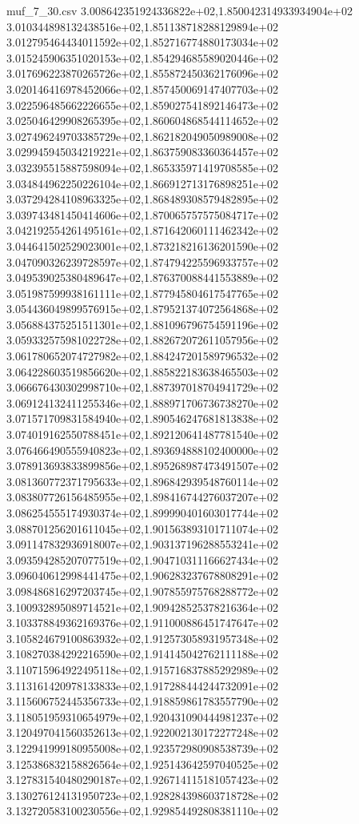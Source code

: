\begin{filecontents*}{muf_7_30.csv}
3.008642351924336822e+02,1.850042314933934904e+02
3.010344898132438516e+02,1.851138718288129894e+02
3.012795464434011592e+02,1.852716774880173034e+02
3.015245906351020153e+02,1.854294685589020446e+02
3.017696223870265726e+02,1.855872450362176096e+02
3.020146416978452066e+02,1.857450069147407703e+02
3.022596485662226655e+02,1.859027541892146473e+02
3.025046429908265395e+02,1.860604868544114652e+02
3.027496249703385729e+02,1.862182049050989008e+02
3.029945945034219221e+02,1.863759083360364457e+02
3.032395515887598094e+02,1.865335971419708585e+02
3.034844962250226104e+02,1.866912713176898251e+02
3.037294284108963325e+02,1.868489308579482895e+02
3.039743481450414606e+02,1.870065757575084717e+02
3.042192554261495161e+02,1.871642060111462342e+02
3.044641502529023001e+02,1.873218216136201590e+02
3.047090326239728597e+02,1.874794225596933757e+02
3.049539025380489647e+02,1.876370088441553889e+02
3.051987599938161111e+02,1.877945804617547765e+02
3.054436049899576915e+02,1.879521374072564868e+02
3.056884375251511301e+02,1.881096796754591196e+02
3.059332575981022728e+02,1.882672072611057956e+02
3.061780652074727982e+02,1.884247201589796532e+02
3.064228603519856620e+02,1.885822183638465503e+02
3.066676430302998710e+02,1.887397018704941729e+02
3.069124132411255346e+02,1.888971706736738270e+02
3.071571709831584940e+02,1.890546247681813838e+02
3.074019162550788451e+02,1.892120641487781540e+02
3.076466490555940823e+02,1.893694888102400000e+02
3.078913693833899856e+02,1.895268987473491507e+02
3.081360772371795633e+02,1.896842939548760114e+02
3.083807726156485955e+02,1.898416744276037207e+02
3.086254555174930374e+02,1.899990401603017744e+02
3.088701256201611045e+02,1.901563893101711074e+02
3.091147832936918007e+02,1.903137196288553241e+02
3.093594285207077519e+02,1.904710311166627434e+02
3.096040612998441475e+02,1.906283237678808291e+02
3.098486816297203745e+02,1.907855975768288772e+02
3.100932895089714521e+02,1.909428525378216364e+02
3.103378849362169376e+02,1.911000886451747647e+02
3.105824679100863932e+02,1.912573058931957348e+02
3.108270384292216590e+02,1.914145042762111188e+02
3.110715964922495118e+02,1.915716837885292989e+02
3.113161420978133833e+02,1.917288444244732091e+02
3.115606752445356733e+02,1.918859861783557790e+02
3.118051959310654979e+02,1.920431090444981237e+02
3.120497041560352613e+02,1.922002130172277248e+02
3.122941999180955008e+02,1.923572980908538739e+02
3.125386832158826564e+02,1.925143642597040525e+02
3.127831540480290187e+02,1.926714115181057423e+02
3.130276124131950723e+02,1.928284398603718728e+02
3.132720583100230556e+02,1.929854492808381110e+02

\end{filecontents*}
